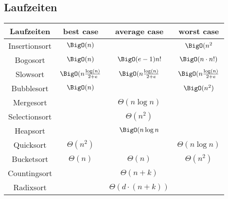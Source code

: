 	\subsection{Laufzeiten}
	\begin{center}
		\begin{tabular} {c|c|c|c}
			Laufzeiten & best case & average case & worst case \\
			\hline
			Insertionsort & $\BigO(n)$ & & $\BigO(n^2$ \\
			\hline
			Bogosort & $\BigO(n)$ & $\BigO(e-1)n!$ & $\BigO(n\cdot n!)$ \\
			\hline
			Slowsort & $\BigO(n\frac{\log(n)}{2+e}$ & $\BigO(n\frac{\log(n)}{2+e}$ & $\BigO(n\frac{\log(n)}{2+e}$ \\
			\hline
			Bubblesort & $\BigO(n)$ & & $\BigO(n^2)$ \\
			\hline
			Mergesort &  & $\Theta(n\log n)$ &  \\
			\hline
			Selectionsort &  & $\Theta(n^2)$ &  \\
			\hline
			Heapsort & & $\BigO(n \log n$ & \\
			\hline
			Quicksort & $\Theta(n^2)$ & & $\Theta(n\log n)$ \\
			\hline
			Bucketsort & $\Theta(n)$ & $\Theta(n)$ & $\Theta(n^2)$ \\
			\hline
			Countingsort & & $\Theta(n+k)$ & \\
			\hline
			Radixsort & & $\Theta(d\cdot(n+k))$ & \\
			
		\end{tabular}
	\end{center}